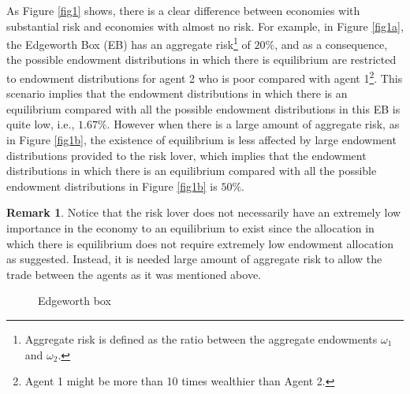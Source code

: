 \documentclass[pdftex]{article}
\numberwithin{equation}{section}
\theoremstyle{th}
\newtheorem{proof lemma}{{Proof Lemma}.}
\theoremstyle{definition}
\newtheorem{remark}{Remark}%
\newtheorem*{risk lovers}{Risk lovers}
\newtheorem*{risk averse}{Risk averse}
\begin{document}
As Figure \ref{fig1} shows, there is a clear difference between economies with substantial risk and economies with almost no risk. For example, in Figure \ref{fig1a}, the Edgeworth Box (EB) has an aggregate risk\footnote{Aggregate risk is defined as the ratio between the aggregate endowments $\omega_1$ and $\omega_2$.} of $20\%$, and as a consequence, the possible endowment distributions in which there is equilibrium are restricted to endowment distributions for agent 2 who is poor compared with agent 1\footnote{Agent 1 might be more than 10 times wealthier than Agent 2.}. This scenario implies that the endowment distributions in which there is an equilibrium compared with all the possible endowment distributions in this EB is quite low, i.e., $1.67\%$. However when there is a large amount of aggregate risk, as in Figure \ref{fig1b}, the existence of equilibrium is less affected by large endowment distributions provided to the risk lover, which implies that the endowment distributions in which there is an equilibrium compared with all the possible endowment distributions in Figure \ref{fig1b} is $50\%$.
\begin{remark}
{Notice that the risk lover does not necessarily have an extremely low importance in the economy to an equilibrium to exist since the allocation in which there is equilibrium does not require extremely low endowment allocation as \cite{Aumann2} suggested. Instead, it is needed large amount of aggregate risk to allow the trade between the agents as it was mentioned above.}
\end{remark}



\begin{figure}[h]
\begin{center}
\end{center}%
\caption{Edgeworth box\label{figEB}}
\end{figure}
\end{document}

